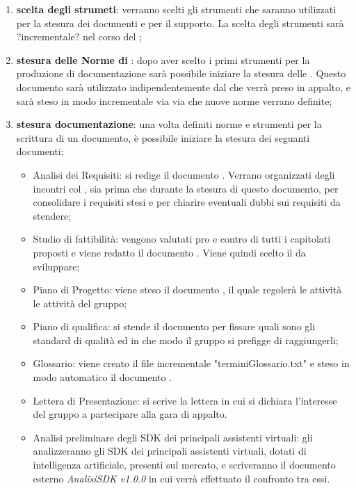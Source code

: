 \documentclass[./PianoDiProgetto.tex]{subfiles}
\begin{document}
  \begin{enumerate}
		\item \textbf{scelta degli strumeti}: verranno scelti gli strumenti che saranno utilizzati per la stesura dei documenti e per il supporto. La scelta degli strumenti sarà ?incrementale? nel corso del ;
		\item \textbf{stesura delle Norme di }: dopo aver scelto i primi strumenti per la produzione di documentazione sarà possibile iniziare la stesura delle \NPdocRR. Questo documento sarà utilizzato indipendentemente dal  che verrà preso in appalto, e sarà steso in modo incrementale via via che nuove norme verrano definite;
		\item \textbf{stesura documentazione}: una volta definiti norme e strumenti per la scrittura di un documento, è possibile iniziare la stesura dei seguanti documenti;
    \begin{itemize}
      \item Analisi dei Requisiti: si redige il documento \ARdocRR. Verrano organizzati degli incontri col , sia prima che durante la stesura di questo documento, per consolidare i requisiti stesi e per chiarire eventuali dubbi sui requisiti da stendere;
      \item Studio di fattibilità: vengono valutati pro e contro di tutti i capitolati proposti e viene redatto il documento \SFdocRR. Viene quindi scelto il  da sviluppare;
      \item Piano di Progetto: viene steso il documento \PPdocRR, il quale regolerà le attività le attività del gruppo;
      \item Piano di qualifica: si stende il documento \PQdocRR per fissare quali sono gli standard di qualità ed in che modo il gruppo si prefigge di raggiungerli;
      \item Glossario: viene creato il file incrementale "terminiGlossario.txt" e steso in modo automatico il documento \GldocRR.
      \item Lettera di Presentazione: si scrive la lettera in cui si dichiara l'interesse del gruppo a partecipare alla gara di appalto.
      \item Analisi preliminare degli SDK dei principali assistenti virtuali: gli \ANP{} analizzeranno gli SDK dei principali assistenti virtuali, dotati di intelligenza artificiale, presenti sul mercato, e scriveranno il documento esterno \textit{AnalisiSDK v1.0.0} in cui verrà effettuato il confronto tra  essi.
    \end{itemize}
  \end{enumerate}
\end{document}
